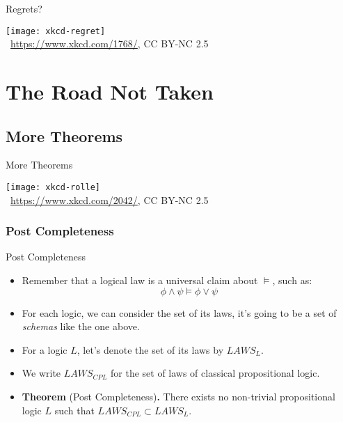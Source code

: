 \begin{frame}{Regrets?}

\begin{center}
  \texttt{[image: xkcd-regret]}\\
  {\tiny \textcopyright~\url{https://www.xkcd.com/1768/}, CC BY-NC 2.5}
\end{center}

\end{frame}


\section{The Road Not Taken}
\subsection{More Theorems}

\begin{frame}{More Theorems} 

\begin{center}
  \texttt{[image: xkcd-rolle]}\\
  {\tiny \textcopyright~\url{https://www.xkcd.com/2042/}, CC BY-NC 2.5}
\end{center}

\end{frame}

\subsubsection{Post Completeness}

\begin{frame}{Post Completeness}

  \begin{itemize}
  \item Remember that a logical law is a universal claim about
    $\vDash$, such as: \[\phi\land \psi\vDash
      \phi\lor \psi\]

  \item For each logic, we can consider the set of its laws, it's
    going to be a set of \emph{schemas} like the one above.

  \item For a logic $L$, let's denote the set of its laws by
    $LAWS_L$.

   \item We write $LAWS_{CPL}$ for the set of laws of classical
    propositional logic.

  \item \textbf{Theorem} (Post Completeness)\textbf{.} There exists no
    non-trivial propositional logic $L$ such that $LAWS_{CPL}\subset
    LAWS_L$. 
    
  \end{itemize}
  
\end{frame}

